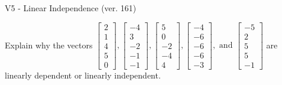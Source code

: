 \begin{exercise}
  \begin{exerciseTitle}V5 - Linear Independence (ver. 161)\end{exerciseTitle}
  \begin{exerciseStatement}
    Explain why the vectors \(\left[\begin{array}{r}
2 \\
1 \\
4 \\
5 \\
0
\end{array}\right] , \left[\begin{array}{r}
-4 \\
3 \\
-2 \\
-1 \\
-1
\end{array}\right] , \left[\begin{array}{r}
5 \\
0 \\
-2 \\
-4 \\
4
\end{array}\right] , \left[\begin{array}{r}
-4 \\
-6 \\
-6 \\
-6 \\
-3
\end{array}\right] , \text{ and } \left[\begin{array}{r}
-5 \\
2 \\
5 \\
5 \\
-1
\end{array}\right]\) are linearly dependent or linearly independent.	



\end{exerciseStatement}
\end{exercise}
